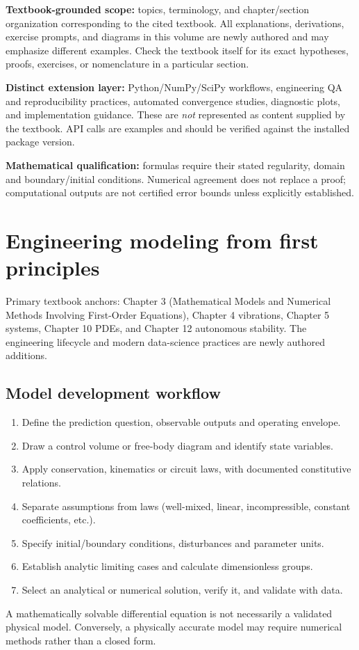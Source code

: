 \documentclass[11pt,letterpaper,oneside]{report}
\theoremstyle{definition}\newtheorem{definition}[theorem]{Definition}
\theoremstyle{remark}\newtheorem{remark}[theorem]{Remark}
\begin{document}
\begin{bookground}
\textbf{Textbook-grounded scope:} topics, terminology, and chapter/section organization corresponding to the cited textbook. All explanations, derivations, exercise prompts, and diagrams in this volume are newly authored and may emphasize different examples. Check the textbook itself for its exact hypotheses, proofs, exercises, or nomenclature in a particular section.
\end{bookground}
\begin{modern}
\textbf{Distinct extension layer:} Python/NumPy/SciPy workflows, engineering QA and reproducibility practices, automated convergence studies, diagnostic plots, and implementation guidance. These are \emph{not} represented as content supplied by the textbook. API calls are examples and should be verified against the installed package version.
\end{modern}
\begin{caution}
\textbf{Mathematical qualification:} formulas require their stated regularity, domain and boundary/initial conditions. Numerical agreement does not replace a proof; computational outputs are not certified error bounds unless explicitly established.
\end{caution}
\tableofcontents\clearpage{}
\chapter{Engineering modeling from first principles}
\begin{bookground}Primary textbook anchors: Chapter 3 (Mathematical Models and Numerical Methods Involving First-Order Equations), Chapter 4 vibrations, Chapter 5 systems, Chapter 10 PDEs, and Chapter 12 autonomous stability. The engineering lifecycle and modern data-science practices are newly authored additions.\end{bookground}
\section{Model development workflow}
\begin{enumerate}
\item Define the prediction question, observable outputs and operating envelope.
\item Draw a control volume or free-body diagram and identify state variables.
\item Apply conservation, kinematics or circuit laws, with documented constitutive relations.
\item Separate assumptions from laws (well-mixed, linear, incompressible, constant coefficients, etc.).
\item Specify initial/boundary conditions, disturbances and parameter units.
\item Establish analytic limiting cases and calculate dimensionless groups.
\item Select an analytical or numerical solution, verify it, and validate with data.
\end{enumerate}
A mathematically solvable differential equation is not necessarily a validated physical model. Conversely, a physically accurate model may require numerical methods rather than a closed form.
\end{document}
